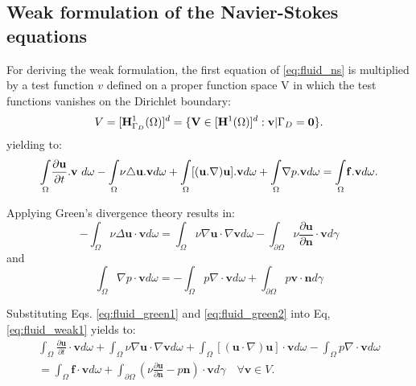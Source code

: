 \subsection{Weak formulation of the Navier-Stokes equations} \label{sec:fluid_weak}

For deriving the weak formulation, the first equation of \ref{eq:fluid_ns} is multiplied by a test function $v$ defined on a proper function space V in which the test functions vanishes on the Dirichlet boundary:
\begin{equation} \label{eq:fluid_space_v}
V = [{\bf H}^{1}_{\Gamma_{D}}(\Omega)]^{d} = \lbrace{\bf V} \in [{\bf H}^{1}(\Omega)]^{d} : {\bf v}|\Gamma_{D} = {\bf 0}\rbrace.
\end{equation}
yielding to:
\begin{equation} \label{eq:fluid_weak1}
{\mathop{\int}_{\Omega}} {\partial {\bf u} \over \partial t}.{\bf v}\ d\omega- {\mathop{\int}_{\Omega}}\nu\triangle{\bf u.v}d\omega+ {\mathop{\int}_{\Omega}}[({\bf u.\nabla){\bf u].{\bf v}}}d\omega+ {\mathop{\int}_{\Omega}}\nabla p.{\bf v}d\omega= {\mathop{\int}_{\Omega}}{\bf f. v}d\omega.
\end{equation}

\noindent Applying Green's divergence theory results in: 
\begin{equation} \label{eq:fluid_green1}
-\int_{\Omega} \nu \Delta \mathbf{u} \cdot \mathbf{v} d \omega=\int_{\Omega} \nu \nabla \mathbf{u} \cdot \nabla \mathbf{v} d \omega-\int_{\partial \Omega} \nu \frac{\partial \mathbf{u}}{\partial \mathbf{n}} \cdot \mathbf{v} d \gamma
\end{equation}
and
\begin{equation} \label{eq:fluid_green2}
\int_{\Omega} \nabla p \cdot \mathbf{v} d \omega=-\int_{\Omega} p \nabla\cdot \mathbf{v} d \omega+\int_{\partial \Omega} p \mathbf{v} \cdot \mathbf{n} d \gamma
\end{equation}

\noindent Substituting Eqs. \ref{eq:fluid_green1} and \ref{eq:fluid_green2} into Eq, \ref{eq:fluid_weak1} yields to:
\begin{equation} \label{eq:fluid_ns_weak}
\begin{array}{r}
\displaystyle\int_{\Omega} \frac{\partial \mathbf{u}}{\partial t} \cdot \mathbf{v} d \omega+\int_{\Omega} \nu \nabla \mathbf{u} \cdot \nabla \mathbf{v} d \omega+\int_{\Omega}[(\mathbf{u} \cdot \nabla) \mathbf{u}] \cdot \mathbf{v} d \omega-\int_{\Omega} p \nabla\cdot \mathbf{v} d \omega \\
\displaystyle=\int_{\Omega} \mathbf{f} \cdot \mathbf{v} d \omega+\int_{\partial \Omega}\left(\nu \frac{\partial \mathbf{u}}{\partial \mathbf{n}}-p \mathbf{n}\right) \cdot \mathbf{v} d \gamma \quad \forall \mathbf{v} \in V .
\end{array}
\end{equation}

